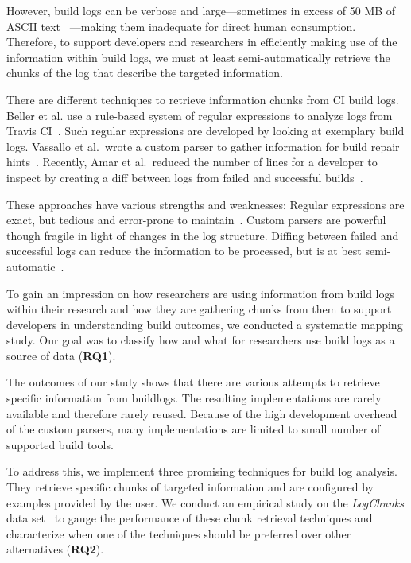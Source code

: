 However, build logs can be verbose and large---sometimes in excess of
50 MB of ASCII text ~\cite{beller2017oops}---making them inadequate
for direct human consumption. Therefore, to support developers and
researchers in efficiently making use of the information within build
logs, we must at least semi-automatically retrieve the chunks of the
log that describe the targeted information.

There are different techniques to retrieve information chunks from CI
build logs. Beller et al. use a rule-based system of regular
expressions to analyze logs from Travis CI~\cite{beller2017oops}.
Such regular expressions are developed by looking at exemplary build
logs.  Vassallo et al.\ wrote a custom parser to gather information
for build repair hints~\cite{vassallo2018un-break}.  Recently, Amar et
al.\ reduced the number of lines for a developer to inspect by
creating a diff between logs from failed and successful
builds~\cite{amar2019mining}.

These approaches have various strengths and weaknesses: Regular
expressions are exact, but tedious and error-prone to
maintain~\cite{michael2019regexes}.  Custom parsers are powerful
though fragile in light of changes in the log structure. Diffing
between failed and successful logs can reduce the information to be
processed, but is at best semi-automatic~\cite{amar2019mining}.

To gain an impression on how researchers are using information from build logs
within their research and how they are gathering chunks from them to support
developers in understanding build outcomes, we conducted a systematic mapping
study.
Our goal was to classify how and what for researchers use build logs as a source
of data (\textbf{RQ1}).

The outcomes of our study shows that there are various attempts to retrieve
specific information from buildlogs. The resulting implementations are rarely
available and therefore rarely reused. Because of the high development overhead
of the custom parsers, many implementations are limited to small number of supported
build tools.

To address this, we implement three promising techniques for build log analysis.
They retrieve specific chunks of targeted information and are configured by
examples provided by the user.
We conduct an empirical study on the \emph{LogChunks} data set~\cite{brandt2020logchunks} to
gauge the performance of these chunk retrieval techniques and characterize
when one of the techniques should be preferred over other alternatives (\textbf{RQ2}).


